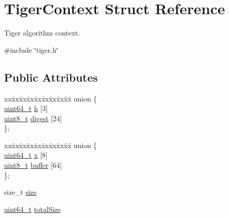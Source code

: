 \hypertarget{structTigerContext}{}\section{Tiger\+Context Struct Reference}
\label{structTigerContext}


Tiger algorithm context.  




{\ttfamily \#include \char`\"{}tiger.\+h\char`\"{}}

\subsection*{Public Attributes}
\begin{DoxyCompactItemize}
\item 
\begin{tabbing}
xx\=xx\=xx\=xx\=xx\=xx\=xx\=xx\=xx\=\kill
union \{\\
\>\hyperlink{stdint_8h_aec6fcb673ff035718c238c8c9d544c47}{uint64\_t} \hyperlink{structTigerContext_a8e54fa64e078ac5f8b1ebeaefd0ca602}{h} \mbox{[}3\mbox{]}\\
\>\hyperlink{stdint_8h_aba7bc1797add20fe3efdf37ced1182c5}{uint8\_t} \hyperlink{structTigerContext_a6fcc8a58aa0d1dc1ffc3d6892ee5b834}{digest} \mbox{[}24\mbox{]}\\
\}; \\

\end{tabbing}\item 
\begin{tabbing}
xx\=xx\=xx\=xx\=xx\=xx\=xx\=xx\=xx\=\kill
union \{\\
\>\hyperlink{stdint_8h_aec6fcb673ff035718c238c8c9d544c47}{uint64\_t} \hyperlink{structTigerContext_ad02bc24aa1dea4fa38c1f8e22593a4e5}{x} \mbox{[}8\mbox{]}\\
\>\hyperlink{stdint_8h_aba7bc1797add20fe3efdf37ced1182c5}{uint8\_t} \hyperlink{structTigerContext_ad927797ce2825ae62c485d5bd912cf43}{buffer} \mbox{[}64\mbox{]}\\
\}; \\

\end{tabbing}\item 
size\+\_\+t \hyperlink{structTigerContext_aa3ff260b3910a8d860222d6807264218}{size}
\item 
\hyperlink{stdint_8h_aec6fcb673ff035718c238c8c9d544c47}{uint64\+\_\+t} \hyperlink{structTigerContext_a2d2f2089fef588839923dd19bbcac2e5}{total\+Size}
\end{DoxyCompactItemize}


